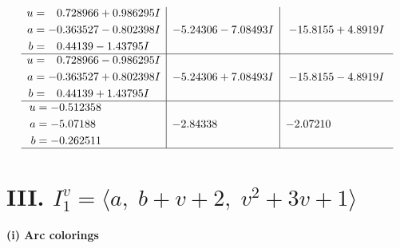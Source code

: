 \documentclass[1p]{elsarticle_modified}
\theoremstyle{definition}
\begin{document}
$$\begin{array}{c|c|c}
\begin{aligned}
u &= \phantom{-}0.728966 + 0.986295 I \\
a &= -0.363527 - 0.802398 I \\
b &= \phantom{-}0.44139 - 1.43795 I\end{aligned}
 & -5.24306 - 7.08493 I & -15.8155 + 4.8919 I \\ \hline\begin{aligned}
u &= \phantom{-}0.728966 - 0.986295 I \\
a &= -0.363527 + 0.802398 I \\
b &= \phantom{-}0.44139 + 1.43795 I\end{aligned}
 & -5.24306 + 7.08493 I & -15.8155 - 4.8919 I \\ \hline\begin{aligned}
u &= -0.512358\phantom{ +0.000000I} \\
a &= -5.07188\phantom{ +0.000000I} \\
b &= -0.262511\phantom{ +0.000000I}\end{aligned}
 & -2.84338\phantom{ +0.000000I} & -2.07210\phantom{ +0.000000I}\\
 \hline 
 \end{array}$$\newpage\newpage\renewcommand{\arraystretch}{1}
\centering \section*{III. $I^v_{1}= \langle a,\;b+v+2,\;v^2+3 v+1 \rangle$}
\flushleft \textbf{(i) Arc colorings}\\
\end{document}
